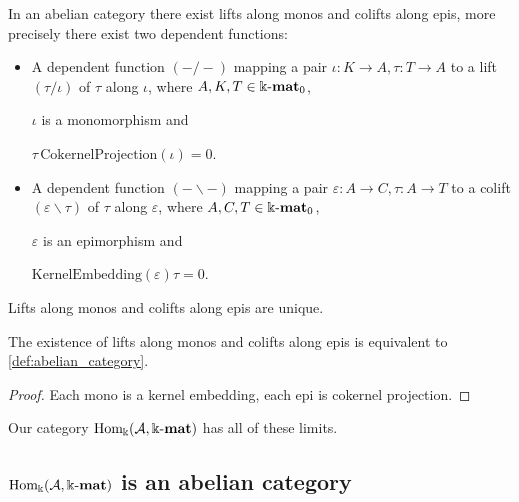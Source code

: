 \begin{example}
In an abelian category there exist lifts along monos and colifts along epis, more precisely there exist two dependent functions:
\begin{itemize}
\item A dependent function $( - / - )$ mapping a pair $\iota : K \rightarrow A, \tau : T \rightarrow A$ to a lift $(\tau / \iota )$ of
$\tau$ along $\iota$, where $A, K, T \in \Bbbk\textnormal{-}\mathbf{mat}_{0}$, 

$\iota$ is a monomorphism and 

$\tau\,\mathrm{CokernelProjection}(\iota) = 0$.

\item A dependent function $( - \backslash - )$ mapping a pair $\varepsilon : A \rightarrow C, \tau : A \rightarrow T$ to a colift
$(\varepsilon \backslash \tau )$ of
$\tau$ along $\varepsilon$, where $A, C, T \in \Bbbk\textnormal{-}\mathbf{mat}_{0}$,

$\varepsilon$ is an epimorphism and

$\mathrm{KernelEmbedding}(\varepsilon)\tau = 0$.

\end{itemize}
Lifts along monos and colifts along epis are unique.
\end{example}

\begin{remark}
The existence of lifts along monos and colifts along epis is equivalent to \ref{def:abelian_category}.
\end{remark}
\begin{proof}

Each mono is a kernel embedding, each epi is cokernel projection.
\end{proof}


Our category $\mathrm{Hom_{\Bbbk}}(\mathcal{A},\Bbbk\textnormal{-}\mathbf{mat})$ has all of these limits.

\subsection{$\mathrm{Hom_{\Bbbk}}(\mathcal{A},\Bbbk\textnormal{-}\mathbf{mat})$ is an abelian category}

